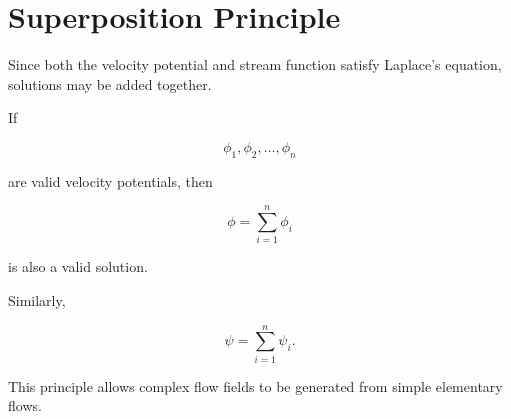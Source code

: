 \section{Superposition Principle}
\label{sec:superposition-principle}

Since both the velocity potential and stream function satisfy Laplace's
equation, solutions may be added together.

\bigskip

If

\[
\phi_1,\phi_2,\ldots,\phi_n
\]

are valid velocity potentials, then

\[
\phi
=
\sum_{i=1}^{n}\phi_i
\]

is also a valid solution.

\bigskip

Similarly,

\[
\psi
=
\sum_{i=1}^{n}\psi_i.
\]

This principle allows complex flow fields to be generated from simple
elementary flows.
